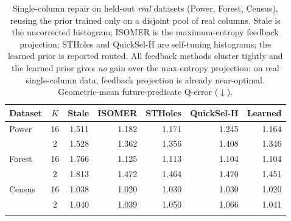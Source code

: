 \begin{table}[t]
  \centering\small
  \caption{Single-column repair on held-out \emph{real} datasets (Power, Forest,
  Census), reusing the prior trained only on a disjoint pool of real columns. Stale is
  the uncorrected histogram; ISOMER is the maximum-entropy feedback projection; STHoles
  and QuickSel-H are self-tuning histograms; the learned prior is reported routed. All
  feedback methods cluster tightly and the learned prior gives \emph{no} gain over the
  max-entropy projection: on real single-column data, feedback projection is already
  near-optimal. Geometric-mean future-predicate Q-error ($\downarrow$).}
  \label{tab:real_singlecol}
  \setlength{\tabcolsep}{6pt}
  \begin{tabular}{l c r r r r r}
    \toprule
    Dataset & $K$ & Stale & ISOMER & STHoles & QuickSel-H & Learned \\
    \midrule
    Power & 16 & 1.511 & 1.182 & 1.171 & 1.245 & 1.164 \\
     & 2 & 1.528 & 1.362 & 1.356 & 1.408 & 1.346 \\
    \addlinespace[2pt]
    Forest & 16 & 1.766 & 1.125 & 1.113 & 1.104 & 1.104 \\
     & 2 & 1.813 & 1.472 & 1.464 & 1.470 & 1.451 \\
    \addlinespace[2pt]
    Census & 16 & 1.038 & 1.020 & 1.030 & 1.030 & 1.020 \\
     & 2 & 1.040 & 1.039 & 1.050 & 1.066 & 1.041 \\
    \addlinespace[2pt]
    \bottomrule
  \end{tabular}
\end{table}

